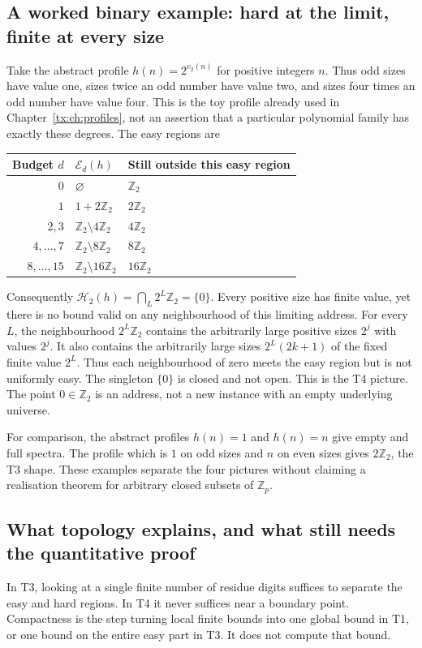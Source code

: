 \subsection{A worked binary example: hard at the limit, finite at every size}
Take the abstract profile $h(n)=2^{v_2(n)}$ for positive integers $n$.
Thus odd sizes have value one, sizes twice an odd number have value
two, and sizes four times an odd number have value four. This is the
toy profile already used in Chapter~\ref{tx:ch:profiles}, not an
assertion that a particular polynomial family has exactly these degrees.
The easy regions are
\begin{center}
\begin{tabular}{@{}rll@{}}
\toprule
Budget $d$ & $\mathcal E_d(h)$ & Still outside this easy region\\
\midrule
$0$ & $\varnothing$ & $\mathbb Z_2$\\
$1$ & $1+2\mathbb Z_2$ & $2\mathbb Z_2$\\
$2,3$ & $\mathbb Z_2\setminus4\mathbb Z_2$ & $4\mathbb Z_2$\\
$4,\ldots,7$ & $\mathbb Z_2\setminus8\mathbb Z_2$ & $8\mathbb Z_2$\\
$8,\ldots,15$ & $\mathbb Z_2\setminus16\mathbb Z_2$ & $16\mathbb Z_2$\\
\bottomrule
\end{tabular}
\end{center}
Consequently $\mathcal H_2(h)=\bigcap_L2^L\mathbb Z_2=\{0\}$.
Every positive size has finite value, yet there is no bound valid on
any neighbourhood of this limiting address. For every $L$, the
neighbourhood $2^L\mathbb Z_2$ contains the arbitrarily large positive
sizes $2^j$ with values $2^j$. It also contains the arbitrarily large
sizes $2^L(2k+1)$ of the fixed finite value $2^L$.
Thus each neighbourhood of zero meets the easy region but is not
uniformly easy. The singleton $\{0\}$ is closed and not open.
This is the T4 picture. The point $0\in\mathbb Z_2$ is an address,
not a new instance with an empty underlying universe.

For comparison, the abstract profiles $h(n)=1$ and $h(n)=n$ give
empty and full spectra. The profile which is $1$ on odd sizes and
$n$ on even sizes gives $2\mathbb Z_2$, the T3 shape. These examples
separate the four pictures without claiming a realisation theorem
for arbitrary closed subsets of $\mathbb Z_p$.

\subsection{What topology explains, and what still needs the quantitative proof}
In T3, looking at a single finite number of residue digits suffices
to separate the easy and hard regions. In T4 it never suffices near
a boundary point. Compactness is the step turning local finite bounds
into one global bound in T1, or one bound on the entire easy part in T3.
It does not compute that bound.

